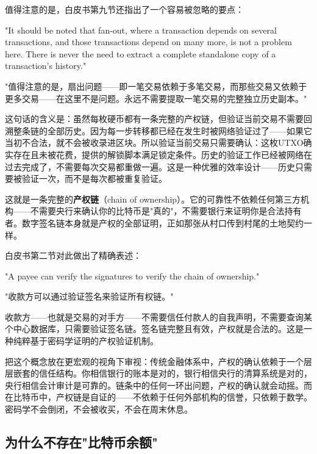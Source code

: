 \documentclass[a4paper,12pt,openany]{ctexbook}
\newenvironment{quoting}{%
  \par\vspace{0.5em}%
  \begin{list}{}{%
    \setlength{\leftmargin}{2em}%
    \setlength{\rightmargin}{2em}%
    \setlength{\parsep}{0.3em}%
    \setlength{\itemsep}{0pt}%
    \setlength{\topsep}{0pt}%
  }%
  \item\relax
}{%
  \end{list}%
  \par\vspace{0.5em}%
}
\begin{document}
值得注意的是，白皮书第九节还指出了一个容易被忽略的要点：


\begin{quoting}
\small
"It should be noted that fan-out, where a transaction depends on several transactions, and those transactions depend on many more, is not a problem here. There is never the need to extract a complete standalone copy of a transaction's history."

"值得注意的是，扇出问题——即一笔交易依赖于多笔交易，而那些交易又依赖于更多交易——在这里不是问题。永远不需要提取一笔交易的完整独立历史副本。"
\end{quoting}


这句话的含义是：虽然每枚硬币都有一条完整的产权链，但验证当前交易不需要回溯整条链的全部历史。因为每一步转移都已经在发生时被网络验证过了——如果它当初不合法，就不会被收录进区块。所以验证当前交易只需要确认：这枚UTXO确实存在且未被花费，提供的解锁脚本满足锁定条件。历史的验证工作已经被网络在过去完成了，不需要每次交易都重做一遍。这是一种优雅的效率设计——历史只需要被验证一次，而不是每次都被重复验证。

这就是一条完整的\textbf{产权链}（chain of ownership）。它的可靠性不依赖任何第三方机构——不需要央行来确认你的比特币是"真的"，不需要银行来证明你是合法持有者。数字签名链本身就是产权的全部证明，正如那张从村口传到村尾的土地契约一样。

白皮书第二节对此做出了精确表述：


\begin{quoting}
\small
"A payee can verify the signatures to verify the chain of ownership."

"收款方可以通过验证签名来验证所有权链。"
\end{quoting}


收款方——也就是交易的对手方——不需要信任付款人的自我声明，不需要查询某个中心数据库，只需要验证签名链。签名链完整且有效，产权就是合法的。这是一种纯粹基于密码学证明的产权验证机制。

把这个概念放在更宏观的视角下审视：传统金融体系中，产权的确认依赖于一个层层嵌套的信任结构。你相信银行的账本是对的，银行相信央行的清算系统是对的，央行相信会计审计是可靠的。链条中的任何一环出问题，产权的确认就会动摇。而在比特币中，产权链是自证的——不依赖于任何外部机构的信誉，只依赖于数学。密码学不会倒闭，不会被收买，不会在周末休息。


\subsection*{为什么不存在"比特币余额"}
\end{document}
